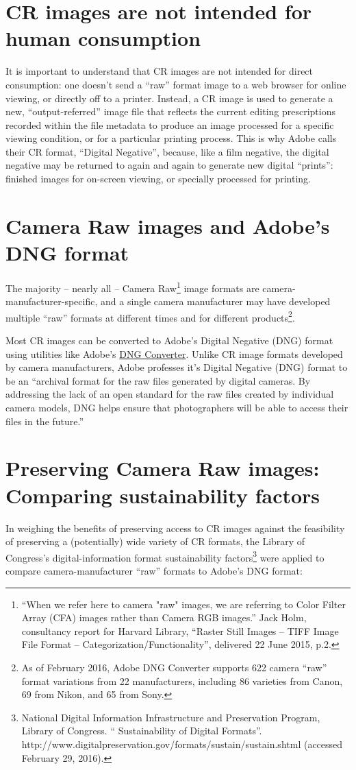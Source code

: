 \documentclass[11pt,a4paper]{article}
\begin{document}
\section{CR images are not intended for human consumption}
It is important to understand that CR images are not intended for direct consumption: one doesn’t send a “raw” format image to a web browser for online viewing, or directly off to a printer. Instead, a CR image is used to generate a new, “output-referred” image file that reflects the current editing prescriptions recorded within the file metadata to produce an image processed for a specific viewing condition, or for a particular printing process. This is why Adobe calls their CR format, “Digital Negative”, because, like a film negative, the digital negative may be returned to again and again to generate new digital “prints”: finished images for on-screen viewing, or specially processed for printing.

\section{Camera Raw images and Adobe’s DNG format}
The majority -- nearly all -- Camera Raw\footnote{“When we refer here to camera "raw" images, we are referring to Color Filter Array (CFA) images rather than Camera RGB images.” Jack Holm, consultancy report for Harvard Library, “Raster Still Images -- TIFF Image File Format -- Categorization/Functionality”, delivered 22 June 2015, p.2.
} image formats are camera-manufacturer-specific, and a single camera manufacturer may have developed multiple “raw” formats at different times and for different products\footnote{As of February 2016, Adobe DNG Converter supports 622 camera “raw” format variations from 22 manufacturers, including 86 varieties from Canon, 69 from Nikon, and 65 from Sony.}.

Most CR images can be converted to Adobe’s Digital Negative (DNG) format using utilities like Adobe’s \hyperlink{https://web.archive.org/web/20160323103742/https://helpx.adobe.com/photoshop/using/adobe-dng-converter.html}{DNG Converter}. Unlike CR image formats developed by camera manufacturers, Adobe professes it’s Digital Negative (DNG) format to be an “archival format for the raw files generated by digital cameras. By addressing the lack of an open standard for the raw files created by individual camera models, DNG helps ensure that photographers will be able to access their files in the future.”

\section{Preserving Camera Raw images: Comparing sustainability factors}
In weighing the benefits of preserving access to CR images against the feasibility of preserving a (potentially) wide variety of CR formats, the Library of Congress’s digital-information format sustainability factors\footnote{National Digital Information Infrastructure and Preservation Program, Library of Congress. “ Sustainability of Digital Formats”. http://www.digitalpreservation.gov/formats/sustain/sustain.shtml (accessed February 29, 2016).} were applied to compare camera-manufacturer “raw” formats to Adobe’s DNG format:
\end{document}
